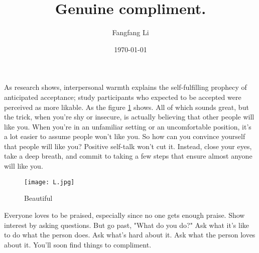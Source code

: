 \documentclass{article}
\title{ Genuine compliment.}
\author{Fangfang Li}
\date{\today}
\begin{document}
\maketitle
As research shows, interpersonal warmth explains the self-fulfilling prophecy of anticipated acceptance; study participants who expected to be accepted were perceived as more likable. As the figure \ref{1} shows.  All of which sounds great, but the trick, when you're shy or insecure, is actually believing that other people will like you. When you're in an unfamiliar setting or an uncomfortable position, it's a lot easier to assume people won't like you. So how can you convince yourself that people will like you? Positive self-talk won't cut it. Instead, close your eyes, take a deep breath, and commit to taking a few steps that ensure almost anyone will like you.

\begin{figure}[htbp]
\centering
\texttt{[image: L.jpg]}
\caption{Beautiful}
\label{1}
\end{figure}

\par Everyone loves to be praised, especially since no one gets enough praise. Show interest by asking questions.\cite{higham1994bibtex} But go past, "What do you do?" Ask what it's like to do what the person does. Ask what's hard about it. Ask what the person loves about it. You'll soon find things to compliment.
\renewcommand\refname{Reference}


\end{document}
